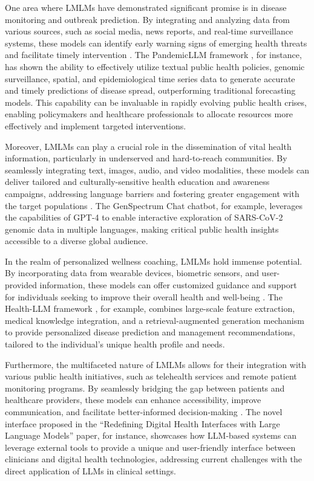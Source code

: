 \documentclass[11pt]{article}
\begin{document}
One area where LMLMs have demonstrated significant promise is in disease monitoring and outbreak prediction. By integrating and analyzing data from various sources, such as social media, news reports, and real-time surveillance systems, these models can identify early warning signs of emerging health threats and facilitate timely intervention \cite{ref210}. The PandemicLLM framework \cite{ref210}, for instance, has shown the ability to effectively utilize textual public health policies, genomic surveillance, spatial, and epidemiological time series data to generate accurate and timely predictions of disease spread, outperforming traditional forecasting models. This capability can be invaluable in rapidly evolving public health crises, enabling policymakers and healthcare professionals to allocate resources more effectively and implement targeted interventions.

Moreover, LMLMs can play a crucial role in the dissemination of vital health information, particularly in underserved and hard-to-reach communities. By seamlessly integrating text, images, audio, and video modalities, these models can deliver tailored and culturally-sensitive health education and awareness campaigns, addressing language barriers and fostering greater engagement with the target populations \cite{ref211}. The GenSpectrum Chat \cite{ref211} chatbot, for example, leverages the capabilities of GPT-4 to enable interactive exploration of SARS-CoV-2 genomic data in multiple languages, making critical public health insights accessible to a diverse global audience.

In the realm of personalized wellness coaching, LMLMs hold immense potential. By incorporating data from wearable devices, biometric sensors, and user-provided information, these models can offer customized guidance and support for individuals seeking to improve their overall health and well-being \cite{ref195,ref1}. The Health-LLM framework \cite{ref195}, for example, combines large-scale feature extraction, medical knowledge integration, and a retrieval-augmented generation mechanism to provide personalized disease prediction and management recommendations, tailored to the individual's unique health profile and needs.

Furthermore, the multifaceted nature of LMLMs allows for their integration with various public health initiatives, such as telehealth services and remote patient monitoring programs. By seamlessly bridging the gap between patients and healthcare providers, these models can enhance accessibility, improve communication, and facilitate better-informed decision-making \cite{ref71}. The novel interface proposed in the ``Redefining Digital Health Interfaces with Large Language Models'' paper, for instance, showcases how LLM-based systems can leverage external tools to provide a unique and user-friendly interface between clinicians and digital health technologies, addressing current challenges with the direct application of LLMs in clinical settings.
\end{document}
